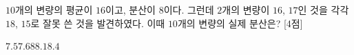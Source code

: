 $10$개의 변량의 평균이 $16$이고, 분산이 $8$이다. 그런데 $2$개의 변량이 $16$, $17$인 것을 각각 $18$, $15$로 잘못 쓴 것을 발견하였다. 이때 $10$개의 변량의 실제 분산은? \mbox{[4점]}
\begin{choices32}{$7.5$}{$7.6$}{$8$}{$8.1$}{$8.4$}\end{choices32}
